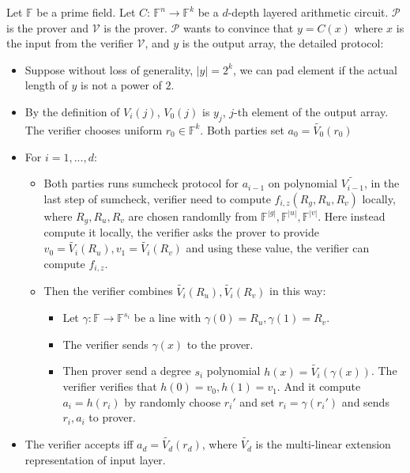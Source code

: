\begin{protocol}
\label{protocol::CMT}
Let $\mathbb{F}$ be a prime field. Let $C$: $\mathbb{F}^n\rightarrow \mathbb{F}^k$ be a $d$-depth layered arithmetic circuit. $\mathcal{P}$ is the prover and $\mathcal{V}$ is the prover. $\mathcal{P}$ wants to convince that $y=C(x)$ where $x$ is the input from the verifier $\mathcal{V}$, and $y$ is the output array, the detailed protocol:

\begin{itemize}
	\item Suppose without loss of generality, $|y|=2^k$, we can pad element if the actual length of $y$ is not a power of $2$.
	\item By the definition of $V_i(j)$, $V_0(j)$ is $y_j$, $j$-th element of the output array. The verifier chooses uniform $r_0 \in \mathbb{F}^k$. Both parties set $a_0=\tilde{V_0}(r_0)$
	\item For $i=1,...,d$:
	\begin{itemize}
		\item Both parties runs sumcheck protocol for $a_{i-1}$ on polynomial $\tilde{V_{i-1}}$, in the last step of sumcheck, verifier need to compute $f_{i,z}(R_{g}, R_{u}, R_{v})$ locally, where $R_{g}, R_{u}, R_{v}$ are chosen randomlly from $\mathbb{F}^{|g|},\mathbb{F}^{|u|},\mathbb{F}^{|v|}$. Here instead compute it locally, the verifier asks the prover to provide $v_0=\tilde{V_{i}}(R_{u}), v_1=\tilde{V_{i}}(R_{v})$ and using these value, the verifier can compute $f_{i,z}$.
		\item Then the verifier combines $\tilde{V_{i}}(R_{u}), \tilde{V_{i}}(R_{v})$ in this way: 
		\begin{itemize}
			\item Let $\gamma: \mathbb{F} \rightarrow \mathbb{F}^{s_i}$ be a line with $\gamma(0)=R_{u}, \gamma(1)=R_{v}$. 
			\item The verifier sends $\gamma(x)$ to the prover. 
			\item Then prover send a degree $s_i$ polynomial $h(x)=\tilde{V_{i}}(\gamma(x))$. The verifier verifies that $h(0)=v_0, h(1)=v_1$. And it compute $a_i=h(r_i)$ by randomly choose $r_i'$ and set $r_i=\gamma(r_i')$ and sends $r_i, a_i$ to prover.
		\end{itemize}
	\end{itemize}
	\item The verifier accepts iff $a_d = \tilde{V_d}(r_d)$, where $\tilde{V_d}$ is the multi-linear extension representation of input layer.
\end{itemize}
\end{protocol}


